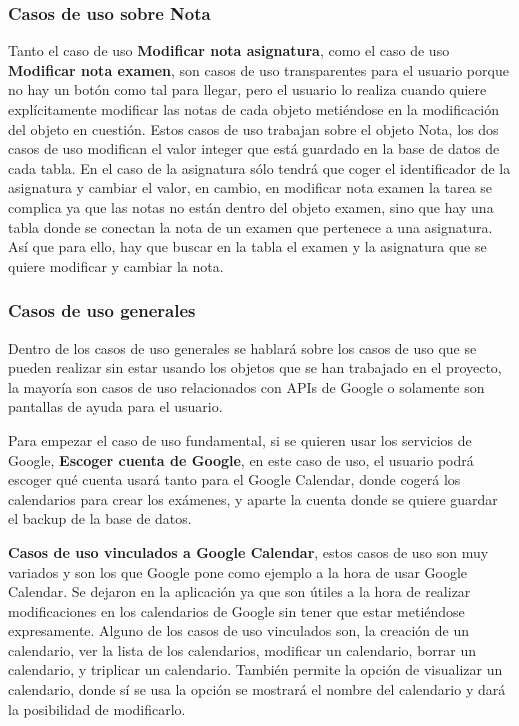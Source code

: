 \subsubsection{Casos de uso sobre Nota}
\label{subsubsecc:Casos de uso sobre Nota}

Tanto el caso de uso \textbf{Modificar nota asignatura}, como el caso de uso \textbf{Modificar nota examen}, son casos de uso transparentes para el usuario porque no hay un botón como tal para llegar, pero el usuario lo realiza cuando quiere explícitamente modificar las notas de cada objeto metiéndose en la modificación del objeto en cuestión.
Estos casos de uso trabajan sobre el objeto Nota, los dos casos de uso modifican el valor integer que está guardado en la base de datos de cada tabla. En el caso de la asignatura sólo tendrá que coger el identificador de la asignatura y cambiar el valor, en cambio, en modificar nota examen la tarea se complica ya que las notas no están dentro del objeto examen, sino que hay una tabla donde se conectan la nota de un examen que pertenece a una asignatura. Así que para ello, hay que buscar en la tabla el examen y la asignatura que se quiere modificar y cambiar la nota.

\subsubsection{Casos de uso generales}
\label{subsubsecc:Casos de uso generales}

Dentro de los casos de uso generales se hablará sobre los casos de uso que se pueden realizar sin estar usando los objetos que se han trabajado en el proyecto, la mayoría son casos de uso relacionados con APIs de Google o solamente son pantallas de ayuda para el usuario.

Para empezar el caso de uso fundamental, si se quieren usar los servicios de Google, \textbf{Escoger cuenta de Google}, en este caso de uso, el usuario podrá escoger qué cuenta usará tanto para el Google Calendar, donde cogerá los calendarios para crear los exámenes, y aparte la cuenta donde se quiere guardar el backup de la base de datos.

\textbf{Casos de uso vinculados a Google Calendar}, estos casos de uso son muy variados y son los que Google pone como ejemplo a la hora de usar Google Calendar. Se dejaron en la aplicación ya que son útiles a la hora de realizar modificaciones en los calendarios de Google sin tener que estar metiéndose expresamente.
Alguno de los casos de uso vinculados son, la creación de un calendario, ver la lista de los calendarios, modificar un calendario, borrar un calendario, y triplicar un calendario. También permite la opción de visualizar un calendario, donde sí se usa la opción se mostrará el nombre del calendario y dará la posibilidad de modificarlo.

